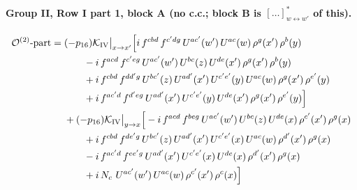 \documentclass[10pt]{article}
\numberwithin{equation}{section}
\newcommand{\OO}{\mathcal O}
\newcommand{\KK}{\mathcal K}
\begin{document}
\paragraph{Group II, Row I part 1, block A (no c.c.; block B is $[\dots]^*_{w\leftrightarrow w'}$ of this).}
\begin{align}
\OO^{(2)}\text{-part}={}&(-p_{16})\KK_{\rm IV}\big|_{x\to x'}\Big[i\,f^{cbd}\,f^{c'dg}\,U^{ac'}(w')\,U^{ac}(w)\,\rho^{g}(x')\,\rho^{b}(y)\notag\\
&\qquad-i\,f^{acd}\,f^{c'eg}\,U^{ac'}(w')\,U^{bc}(z)\,U^{de}(x')\,\rho^{g}(x')\,\rho^{b}(y)\notag\\
&\qquad+i\,f^{cbd}\,f^{dd'g}\,U^{bc'}(z)\,U^{ad'}(x')\,U^{c'e'}(y)\,U^{ac}(w)\,\rho^{g}(x')\,\rho^{e'}(y)\notag\\
&\qquad+i\,f^{ac'd}\,f^{d'eg}\,U^{ad'}(x')\,U^{c'e'}(y)\,U^{de}(x')\,\rho^{g}(x')\,\rho^{e'}(y)\Big]\notag\\
&+(-p_{16})\KK_{\rm IV}\big|_{y\to x}\Big[-i\,f^{acd}\,f^{beg}\,U^{ac'}(w')\,U^{bc}(z)\,U^{de}(x)\,\rho^{c'}(x')\,\rho^{g}(x)\notag\\
&\qquad+i\,f^{cbd}\,f^{de'g}\,U^{bc'}(z)\,U^{ad'}(x')\,U^{c'e'}(x)\,U^{ac}(w)\,\rho^{d'}(x')\,\rho^{g}(x)\notag\\
&\qquad-i\,f^{ac'd}\,f^{ee'g}\,U^{ad'}(x')\,U^{c'e'}(x)\,U^{de}(x)\,\rho^{d'}(x')\,\rho^{g}(x)\notag\\
&\qquad+i\,N_c\,\,U^{ac'}(w')\,U^{ac}(w)\,\rho^{c'}(x')\,\rho^{c}(x)\Big]
\end{align}
\end{document}
